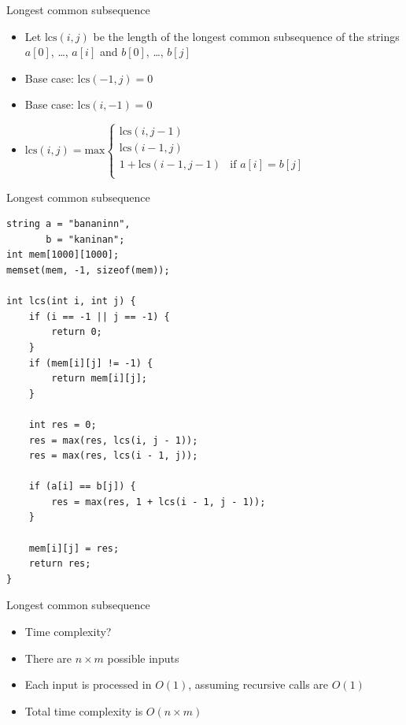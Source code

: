 \documentclass{beamer}
\begin{document}
\begin{frame}[plain]{Longest common subsequence}
    \vspace{20pt}
    \begin{itemize}
\item Let $\mathrm{lcs}(i, j)$ be the length of the longest common subsequence of the strings $a[0]$, \ldots, $a[i]$ and $b[0]$, \ldots, $b[j]$

    \vspace{10pt}
\item Base case: $\mathrm{lcs}(-1, j) = 0$
\item Base case: $\mathrm{lcs}(i, -1) = 0$
    \vspace{10pt}
\item $\mathrm{lcs}(i, j) = \mathrm{max} \left\{
	\begin{array}{ll}
        \mathrm{lcs}(i,j-1) & \\
        \mathrm{lcs}(i-1,j) & \\
        1 + \mathrm{lcs}(i-1,j-1) & \textrm{if } a[i] = b[j] \\
	\end{array}
\right.$
    \end{itemize}
\end{frame}

\begin{frame}{Longest common subsequence}
    \begin{verbatim}
string a = "bananinn",
       b = "kaninan";
int mem[1000][1000];
memset(mem, -1, sizeof(mem));

int lcs(int i, int j) {
    if (i == -1 || j == -1) {
        return 0;
    }
    if (mem[i][j] != -1) {
        return mem[i][j];
    }

    int res = 0;
    res = max(res, lcs(i, j - 1));
    res = max(res, lcs(i - 1, j));

    if (a[i] == b[j]) {
        res = max(res, 1 + lcs(i - 1, j - 1));
    }

    mem[i][j] = res;
    return res;
}
    \end{verbatim}
\end{frame}

\begin{frame}[plain]{Longest common subsequence}
    \vspace{40pt}
    \begin{itemize}
        \item Time complexity?
            \vspace{10pt}
        \item There are $n\times m$ possible inputs
        \item Each input is processed in $O(1)$, assuming recursive calls are $O(1)$
        \item Total time complexity is $O(n\times m)$
    \end{itemize}
\end{frame}
\end{document}
